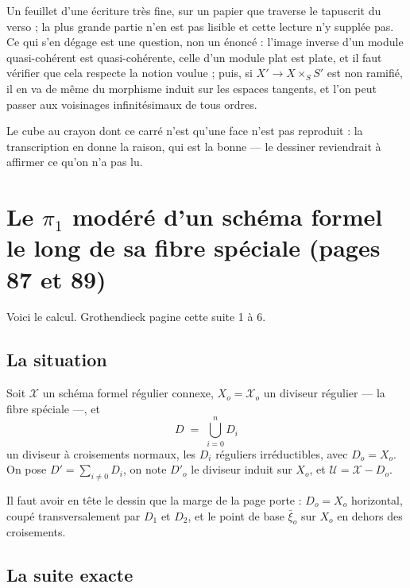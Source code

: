 \documentclass[11pt,a4paper]{article}
\begin{document}
Un feuillet d'une écriture très fine, sur un papier que traverse le tapuscrit
du verso ; la plus grande partie n'en est pas lisible et cette lecture n'y
supplée pas. Ce qui s'en dégage est une question, non un énoncé : l'image
inverse d'un module quasi-cohérent est quasi-cohérente, celle d'un module plat
est plate, et il faut vérifier que cela respecte la notion voulue ; puis, si
$X' \to X \times_{S} S'$ est non ramifié, il en va de même du morphisme induit
sur les espaces tangents, et l'on peut passer aux voisinages infinitésimaux de
tous ordres.


Le cube au crayon dont ce carré n'est qu'une face n'est pas reproduit : la
transcription en donne la raison, qui est la bonne --- le dessiner reviendrait
à affirmer ce qu'on n'a pas lu.

\section*{Le $\pi_{1}$ modéré d'un schéma formel le long de sa fibre spéciale (pages 87 et 89)}

Voici le calcul. Grothendieck pagine cette suite 1 à 6.

\subsection*{La situation}

Soit $\mathcal{X}$ un schéma formel régulier connexe, $X_{o} = \mathcal{X}_{o}$
un diviseur régulier --- la fibre spéciale ---, et
\[
  D \;=\; \bigcup_{i=0}^{n} D_{i}
\]
un diviseur à croisements normaux, les $D_{i}$ réguliers irréductibles, avec
$D_{o} = X_{o}$. On pose $D' = \sum_{i \neq 0} D_{i}$, on note $D'_{o}$ le
diviseur induit sur $X_{o}$, et $\mathcal{U} = \mathcal{X} - D_{o}$.

Il faut avoir en tête le dessin que la marge de la page porte : $D_{o} = X_{o}$
horizontal, coupé transversalement par $D_{1}$ et $D_{2}$, et le point de base
$\bar{\xi}_{o}$ sur $X_{o}$ en dehors des croisements.

\subsection*{La suite exacte}
\end{document}
